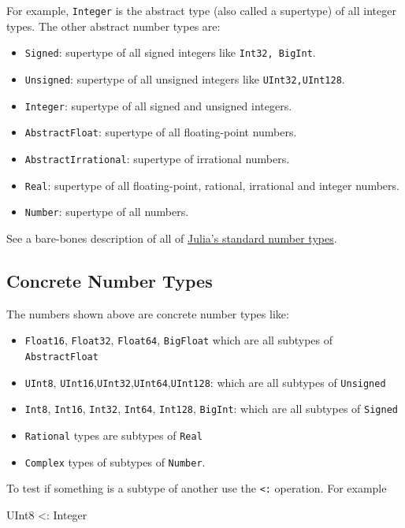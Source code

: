 For example, \texttt{Integer} is the abstract type (also called a supertype) of all integer types.  The other abstract number types are:
\begin{itemize}
\item \texttt{Signed}: supertype of all signed integers like \texttt{Int32, BigInt}.
\item \texttt{Unsigned}: supertype of all unsigned integers like \texttt{UInt32,UInt128}. 
\item \texttt{Integer}: supertype of all signed and unsigned integers.
\item \texttt{AbstractFloat}: supertype of all floating-point numbers. 
\item \texttt{AbstractIrrational}: supertype of irrational numbers. 
\item \texttt{Real}: supertype of all floating-point, rational, irrational and integer numbers.
\item \texttt{Number}: supertype of all numbers. 
\end{itemize}


See a bare-bones description of all of
\href{https://docs.julialang.org/en/v1/base/numbers/}{Julia's standard
number types}.


\subsection{Concrete Number Types}

The numbers shown above are concrete number types like:
\begin{itemize}
\item \texttt{Float16}, \texttt{Float32}, \texttt{Float64}, \texttt{BigFloat}
which are all subtypes of \texttt{AbstractFloat} 
\item \texttt{UInt8},
\texttt{UInt16},\texttt{UInt32},\texttt{UInt64},\texttt{UInt128}: which
are all subtypes of \texttt{Unsigned}
\item  \texttt{Int8}, \texttt{Int16},
\texttt{Int32}, \texttt{Int64}, \texttt{Int128}, \texttt{BigInt}: which
are all subtypes of \texttt{Signed} 
\item \texttt{Rational} types are subtypes of \texttt{Real}
\item \texttt{Complex} types of subtypes of \texttt{Number}.  
\end{itemize}

To test if something is a subtype of another use the \verb!<:! operation. For example

\begin{jlblock}[types]
UInt8 <: Integer
\end{jlblock}

